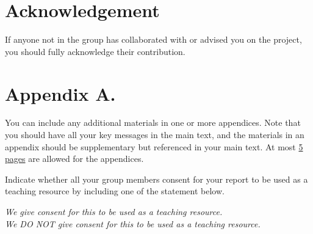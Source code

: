 \documentclass[a4paper,11pt]{article} %
\begin{document}
\section*{Acknowledgement}

If anyone not in the group has collaborated with or advised you on the project, you
should fully acknowledge their contribution.

\section*{Appendix A.}
You can include any additional materials in one or more appendices.
Note that you should have all your key messages in the main text, and the
materials in an appendix should be supplementary but referenced in your main
text.
At most \underline{5 pages} are allowed for the appendices.

\smaller
\printbibliography

\newpage
Indicate whether all your group members consent for your report to be used as a
teaching resource by including one of the statement below.

\begin{center}
\emph{We give consent for this to be used as a teaching resource.}\\
\emph{We DO NOT give consent for this to be used as a teaching resource.}
\end{center}
\end{document}
